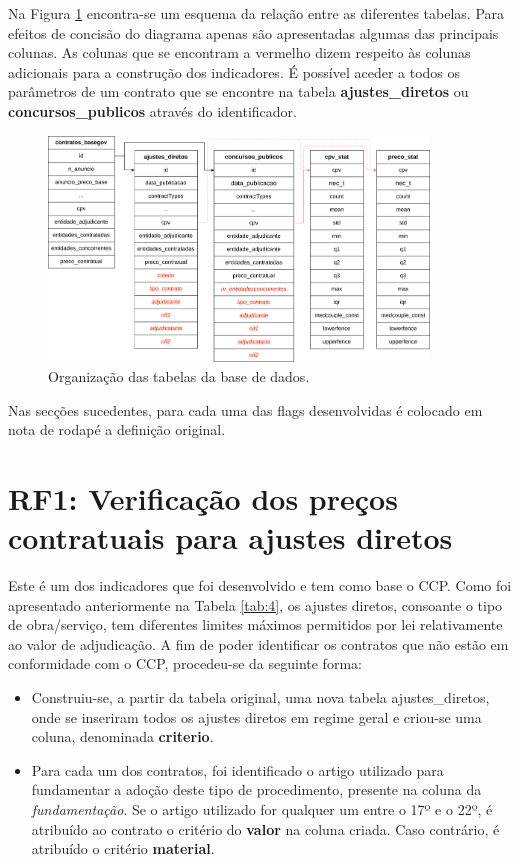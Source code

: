 Na Figura \ref{fig:basededados} encontra-se um esquema da relação entre as diferentes tabelas. Para efeitos de concisão do diagrama apenas são apresentadas algumas das principais colunas. As colunas que se encontram a vermelho dizem respeito às colunas adicionais para a construção dos indicadores. É possível aceder a todos os parâmetros de um contrato que se encontre na tabela \textbf{ajustes\_diretos} ou \textbf{concursos\_publicos} através do identificador. 

\begin{figure}[H]
	\centering
	\includegraphics[width=0.9\textwidth]{imagens/basedadostabelas.png}
	\caption{Organização das tabelas da base de dados.}
	\label{fig:basededados}
\end{figure}

Nas secções sucedentes, para cada uma das flags desenvolvidas é colocado em nota de rodapé a definição original.



\section{RF1: Verificação dos preços contratuais para ajustes diretos}


Este é um dos indicadores que foi desenvolvido e tem como base o CCP. Como foi apresentado anteriormente na Tabela \ref{tab:4}, os ajustes diretos, consoante o tipo de obra/serviço, tem diferentes limites máximos permitidos por lei relativamente ao valor de adjudicação. A fim de poder identificar os contratos que não estão em conformidade com o CCP, procedeu-se da seguinte forma:

\begin{itemize}
	
	\item Construiu-se, a partir da tabela original, uma nova tabela ajustes\_diretos, onde se inseriram todos os ajustes diretos em regime geral e criou-se uma coluna, denominada \textbf{criterio}. 

	\item Para cada um dos contratos, foi identificado o artigo utilizado para fundamentar a adoção deste tipo de procedimento, presente na coluna da \textit{fundamentação}. Se o artigo utilizado for qualquer um entre o 17º e o 22º, é atribuído ao contrato o critério do \textbf{valor} na coluna criada. Caso contrário, é atribuído o critério \textbf{material}.
	
\end{itemize}

